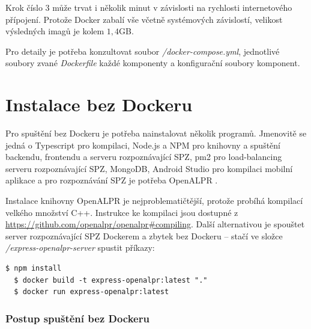 Krok číslo 3 může trvat i několik minut v závislosti na rychlosti internetového
přípojení. Protože Docker zabalí vše včetně systémových závislostí, velikost
výsledných imagů je kolem $1,4$GB.

Pro detaily je potřeba konzultovat soubor \textit{/docker-compose.yml}, jednotlivé soubory
zvané \textit{Dockerfile} každé komponenty a konfigurační soubory komponent.

\section{Instalace bez Dockeru}

\noindent
Pro spuštění bez Dockeru je potřeba nainstalovat několik programů. Jmenovitě se
jedná o Typescript pro kompilaci, Node.js a NPM pro knihovny a spuštění backendu, frontendu
a serveru rozpoznávající SPZ, pm2 pro load-balancing serveru rozpoznávající SPZ, MongoDB,
Android Studio pro kompilaci mobilní aplikace a pro rozpoznávání SPZ je potřeba OpenALPR .

Instalace knihovny OpenALPR je nejproblematičtější, protože
probíhá kompilací velkého množství C++. Instrukce ke kompilaci
jsou dostupné z \url{https://github.com/openalpr/openalpr#compiling}. Další alternativou je spouštet server rozpoznávající SPZ
Dockerem a zbytek bez Dockeru -- stačí ve složce \textit{/express-openalpr-server} spustit příkazy:

\begin{lstlisting}[numbers=none]
  $ npm install
  $ docker build -t express-openalpr:latest "."
  $ docker run express-openalpr:latest 
\end{lstlisting}

\subsubsection*{Postup spuštění bez Dockeru}

